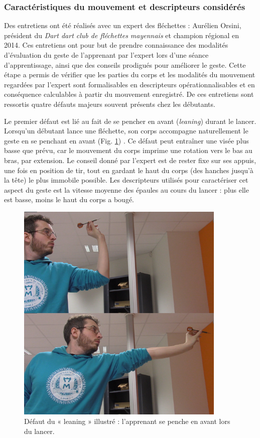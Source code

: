 \subsubsection{Caractéristiques du mouvement et descripteurs considérés}
Des entretiens ont été réalisés avec un expert des fléchettes : Aurélien Orsini, président du \textit{Dart dart club de fléchettes mayennais} et champion régional en 2014. Ces entretiens ont pour but de prendre connaissance des modalités d'évaluation du geste de l'apprenant par l'expert lors d'une séance d'apprentissage, ainsi que des conseils prodigués pour améliorer le geste. Cette étape a permis de vérifier que les parties du corps et les modalités du mouvement regardées par l'expert sont formalisables en descripteurs opérationnalisables et en conséquence calculables à partir du mouvement enregistré. De ces entretiens sont ressortis quatre défauts majeurs souvent présents chez les débutants.

Le premier défaut est lié au fait de se pencher en avant (\textit{leaning}) durant le lancer. Lorsqu'un débutant lance une fléchette, son corps accompagne naturellement le geste en se penchant en avant (Fig. \ref{fig:darts_leaning_final})
. Ce défaut peut entraîner une visée plus basse que prévu, car le mouvement du corps imprime une rotation vers le bas au bras, par extension. Le conseil donné par l'expert est de rester fixe sur ses appuis, une fois en position de tir, tout en gardant le haut du corps (des hanches jusqu'à la tête) le plus immobile possible. Les descripteurs utilisés pour caractériser cet aspect du geste est la vitesse moyenne des épaules au cours du lancer : plus elle est basse, moins le haut du corps a bougé.

\begin{figure}
    \centering
    \includegraphics[width=10cm]{pictures/darts_leaning_final.png}
    \caption[Défaut du « leaning » (se pencher en avant)]{Défaut du « leaning » illustré : l'apprenant se penche en avant lors du lancer.}
    \label{fig:darts_leaning_final}
\end{figure}

